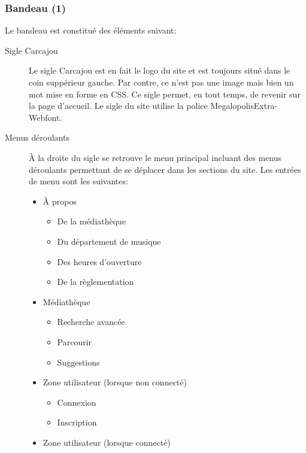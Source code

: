 \documentclass[letter, 11pt]{report}
\begin{document}
\subsubsection{Bandeau (1)}

Le bandeau est constitué des éléments suivant:
\begin{description}
	\item[Sigle Carcajou] Le sigle Carcajou est en fait le logo du site et est toujours situé dans le coin suppérieur gauche. Par contre, ce n'est pas une image mais bien un mot mise en forme en CSS. Ce sigle permet, en tout temps, de revenir sur la page d'accueil. Le sigle du site utilise la police MegalopolisExtra-Webfont.
	\item[Menus déroulants]À la droite du sigle se retrouve le menu principal incluant des menus déroulants permettant de se déplacer dans les sections du site. Les entrées de menu sont les suivantes:
		\begin{itemize}
			\item À propos
				\begin{itemize}
					\item De la médiathèque
					\item Du département de musique
					\item Des heures d'ouverture
					\item De la règlementation
				\end{itemize}
		\end{itemize}
		\begin{itemize}
			\item Médiathèque
			\begin{itemize}
				\item Recherche avancée
				\item Parcourir
				\item Suggestions
			\end{itemize}
		\end{itemize}
		\begin{itemize}
			\item Zone utilisateur (lorsque non connecté)
			\begin{itemize}
				\item Connexion
				\item Inscription
			\end{itemize}
		\end{itemize}
		\begin{itemize}
			\item Zone utilisateur (lorsque connecté)
			\begin{itemize}

\end{itemize}
\end{itemize}
\end{description}
\end{document}
